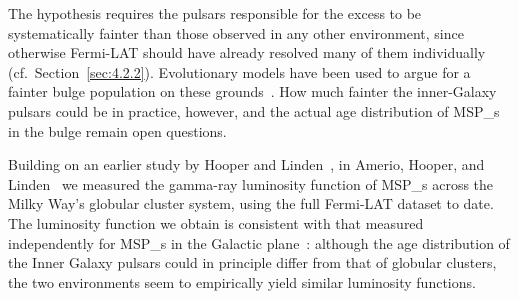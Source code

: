 The \MSP hypothesis requires the pulsars responsible for the excess to be systematically fainter than those observed in any other environment, since otherwise Fermi-LAT should have already resolved many of them individually (cf.\ Section~\ref{sec:4.2.2}).
Evolutionary models have been used to argue for a fainter bulge population on these grounds~\cite{Fragione:2017rsp,Ploeg:2020jeh,Ye:2022yxt}.
How much fainter the inner-Galaxy pulsars could be in practice, however, and the actual age distribution of \glspl{MSP_} in the bulge remain open questions.

Building on an earlier study by Hooper and Linden~\cite{Hooper:2016rap}, in Amerio, Hooper, and Linden~\cite{Amerio:2024qor} we measured the gamma-ray luminosity function of \glspl{MSP_} across the Milky Way's globular cluster system, using the full Fermi-LAT dataset to date.
The luminosity function we obtain is consistent with that measured independently for \glspl{MSP_} in the Galactic plane~\cite{Holst:2024fvb}:
although the age distribution of the Inner Galaxy pulsars could in principle differ from that of globular clusters, the two environments seem to empirically yield similar luminosity functions.

